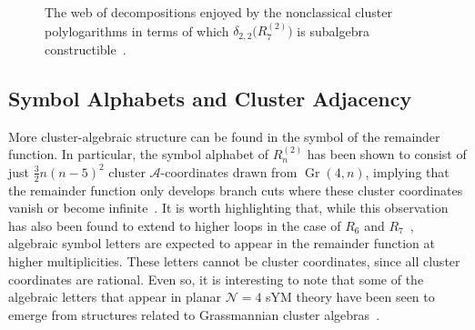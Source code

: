 \documentclass[11pt]{article}
\DeclareMathOperator{\Gr}{Gr}
\begin{document}
\begin{figure}[t] \centering
  \caption{The web of decompositions enjoyed by the nonclassical cluster polylogarithms in terms of which $\delta_{2,2}\big(R^{(2)}_7\big)$\! is subalgebra constructible~\cite{Golden:2018gtk}.}\label{fig:R27_decompositions}
\end{figure}




\subsection{Symbol Alphabets and Cluster Adjacency}

More cluster-algebraic structure can be found in the symbol of the remainder function. In particular, the symbol alphabet of $R_n^{(2)}$\! has been shown to consist of just $\frac{3}{2} n (n - 5)^2$ cluster $\mathcal{A}$-coordinates drawn from $\Gr(4,n)$, implying that the remainder function only develops branch cuts where these cluster coordinates vanish or become infinite~\cite{Golden:2013xva}. It is worth highlighting that, while this observation has also been found to extend to higher loops in the case of $R_6$ and $R_7$~\cite{Caron-Huot:2020bkp,Prlina:2018ukf}, algebraic symbol letters are expected to appear in the remainder function at higher multiplicities. These letters cannot be cluster coordinates, since all cluster coordinates are rational. Even so, it is interesting to note that some of the algebraic letters that appear in planar $\mathcal{N}=4$ sYM theory have been seen to emerge from structures related to Grassmannian cluster algebras~\cite{Drummond:2019cxm,Arkani-Hamed:2019rds,Henke:2019hve,Drummond:2020kqg,Mago:2020kmp,He:2020uhb,Herderschee:2021dez}. 
\end{document}
